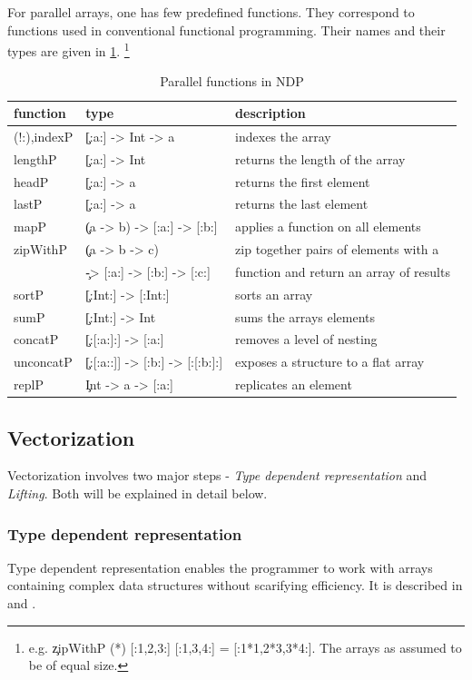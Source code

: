   \p
  For parallel arrays, one has few predefined functions.
  They correspond to functions used in conventional functional programming.
  Their names and their types are given in \ref{table:parfuns}.
  \footnote{e.g. \c{zipWithP (*) [:1,2,3:] [:1,3,4:] = [:1*1,2*3,3*4:]}. The arrays as assumed to be of equal size.}
  \begin{table}[h]
    \caption{Parallel functions in NDP}
    \label{table:parfuns}
    \begin{tabular}{lll}
        \toprule
        function & type & description \\
        \midrule
        (!:),indexP & \c{[:a:] -> Int -> a} & indexes the array \\
        lengthP & \c{[:a:] -> Int} & returns the length of the array \\
        headP & \c{[:a:] -> a} & returns the first element\\
        lastP & \c{[:a:] -> a} & returns the last element \\
        mapP & \c{(a -> b) -> [:a:] -> [:b:]} & applies a function on all elements \\
        zipWithP & \c{(a -> b -> c)} & zip together pairs of elements with a \\
         & \c{-> [:a:] -> [:b:] -> [:c:]} & function and return an array of results \\
        sortP & \c{[:Int:] -> [:Int:]} & sorts an array \\
        sumP & \c{[:Int:] -> Int} & sums the arrays elements \\
        concatP & \c{[:[:a:]:] -> [:a:]} & removes a level of nesting \\
        unconcatP & \c{[:[:a::]] -> [:b:] -> [:[:b:]:]} & exposes a structure to a flat array \\
        replP & \c{Int -> a -> [:a:]} & replicates an element \\
    \end{tabular}
  \end{table}
    
  \subsection{Vectorization}
    Vectorization involves two major steps -
    \emph{Type dependent representation} and \emph{Lifting}.
    Both will be explained in detail below.
  
    \subsubsection{Type dependent representation}
      Type dependent representation enables the programmer
      to work with arrays containing complex
      data structures without scarifying efficiency.
      It is described in 
      \cite{FastArr2003Chakravarty}
      and \cite{DataFamily2005Chakravarty}.
      
